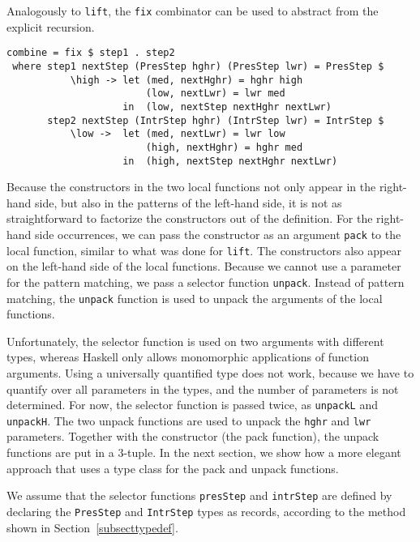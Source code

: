 Analogously to \texttt{lift}, the \texttt{fix} combinator can be used to abstract from the explicit recursion.

\begin{small}
\begin{verbatim}
combine = fix $ step1 . step2
 where step1 nextStep (PresStep hghr) (PresStep lwr) = PresStep $
           \high -> let (med, nextHghr) = hghr high
                        (low, nextLwr) = lwr med
                    in  (low, nextStep nextHghr nextLwr)
       step2 nextStep (IntrStep hghr) (IntrStep lwr) = IntrStep $
           \low ->  let (med, nextLwr) = lwr low
                        (high, nextHghr) = hghr med
                    in  (high, nextStep nextHghr nextLwr)
\end{verbatim}
\end{small}

Because the constructors in the two local functions not only appear in the right-hand side, but also in the patterns of the left-hand side, it is not as straightforward to factorize the constructors out of the definition. For the right-hand side occurrences, we can pass the constructor as an argument \texttt{pack} to the local function, similar to what was done for \texttt{lift}. The constructors also appear on the left-hand side of the local functions. Because we cannot use a parameter for the pattern matching, we pass a selector function \texttt{unpack}. Instead of pattern matching, the \texttt{unpack} function is used to unpack the arguments of the local functions.

Unfortunately, the selector function is used on two arguments with different types, whereas Haskell only allows monomorphic applications of function arguments. Using a universally quantified type does not work, because we have to quantify over all parameters in the types, and the number of parameters is not determined. For now, the selector function is passed twice, as \texttt{unpackL} and \texttt{unpackH}. The two unpack functions are used to unpack the \texttt{hghr} and \texttt{lwr} parameters. Together with the constructor (the pack function), the unpack functions are put in a 3-tuple. In the next section, we show how a more elegant approach that uses a type class for the pack and unpack functions.

We assume that the selector functions \texttt{presStep} and \texttt{intrStep} are defined by declaring the \texttt{PresStep} and \texttt{IntrStep} types as records, according to the method shown in Section~\ref{subsecttypedef}.

